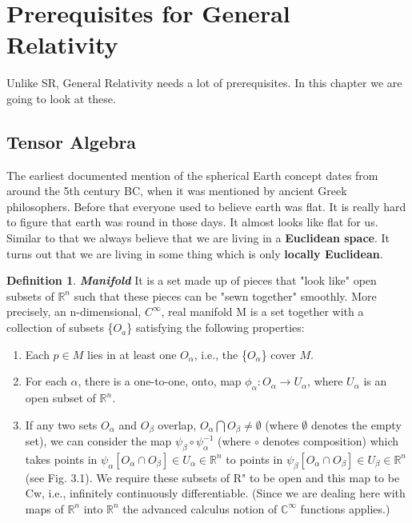 \documentclass[12pt,a4paper]{article}
\numberwithin{table}{section}
\numberwithin{figure}{section}
\numberwithin{equation}{section}
\theoremstyle{remark}
\theoremstyle{definition}
\newtheorem{definition}{Definition}[section]
\begin{document}
\section{Prerequisites for General Relativity}
Unlike SR, General Relativity needs a lot of prerequisites. In this chapter we are going to look at these.

\subsection{Tensor Algebra}
The earliest documented mention of the spherical Earth concept dates from around the 5th century BC, when it was mentioned by ancient Greek philosophers. Before that everyone used to believe earth was flat. It is really hard to figure that earth was round in those days. It almost looks like flat for us. Similar to that we always believe that we are living in a \textbf{Euclidean space}. It turns out that we are living in some thing which is only \textbf{locally Euclidean}.
\begin{definition}{\textbf{\textit{Manifold}}}
It is a set made up of pieces that "look like" open subsets of 
$\mathbb{R}^n$ such that these pieces can be "sewn together" smoothly. More precisely, an n-dimensional, $C^\infty$, real manifold M is a set together with a collection of subsets \{${O_a}$\} satisfying the following properties:
\begin{enumerate}
  \item Each $p \in M$ lies in at least one $O_\alpha$, i.e., the \{$O_\alpha$\} cover $M$. 
  \item For each $\alpha$, there is a one-to-one, onto, map $\phi_\alpha:O_\alpha \rightarrow U_\alpha$, where $U_\alpha$ is an 
open subset of $\mathbb{R}^n$. 
  \item If any two sets $O_\alpha$ and $O_\beta$ overlap, $O_\alpha\bigcap O_\beta\neq\emptyset$ (where $\emptyset$ denotes the empty 
set), we can consider the map $\psi_\beta\circ\psi_\alpha^{-1}$ (where $\circ$ denotes composition) which takes points in $\psi_\alpha[O_\alpha\cap O_\beta]\in U_\alpha \in \mathbb{R}^n$ to points in $\psi_\beta[O_\alpha\cap O_\beta] \in U_\beta \in \mathbb{R}^n$ (see Fig. 3.1). We require these subsets of R" to be open and this map to be Cw, i.e., infinitely continuously differentiable. (Since we are dealing here with maps of $\mathbb{R}^n$ into $\mathbb{R}^n$ the 
advanced calculus notion of $\mathbb{C}^\infty$ functions applies.)

\end{enumerate}
\end{definition}
\end{document}
